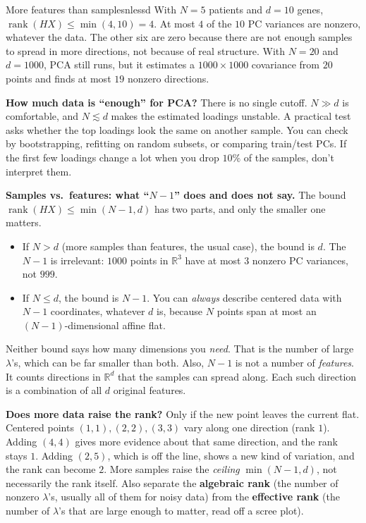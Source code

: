 \documentclass[11pt]{article}
\newcommand{\R}{\mathbb{R}}
\newcommand{\rank}{\operatorname{rank}}
\begin{document}
\begin{example}{More features than samples}{nlessd}
With $N=5$ patients and $d=10$ genes, $\rank(HX)\le\min(4,10)=4$. At most $4$ of
the $10$ PC variances are nonzero, whatever the data. The other six are zero because there
are not enough samples to spread in more directions, not because of real structure. With
$N=20$ and $d=1000$, PCA still runs, but it estimates a $1000\times1000$ covariance from
$20$ points and finds at most $19$ nonzero directions.
\end{example}

\begin{deeper}
\textbf{How much data is ``enough'' for PCA?} There is no single cutoff. $N\gg d$ is
comfortable, and $N\lesssim d$ makes the estimated loadings unstable. A practical test
asks whether the top loadings look the same on another sample. You can check by
bootstrapping, refitting on random subsets, or comparing train/test PCs. If the first few
loadings change a lot when you drop $10\%$ of the samples, don't interpret them.
\end{deeper}

\begin{careful}
\textbf{Samples vs.\ features: what ``$N-1$'' does and does not say.} The bound
$\rank(HX)\le\min(N-1,d)$ has two parts, and only the smaller one matters.
\begin{itemize}[nosep]
\item If $N>d$ (more samples than features, the usual case), the bound is $d$. The $N-1$ is
irrelevant: $1000$ points in $\R^3$ have at most $3$ nonzero PC variances, not $999$.
\item If $N\le d$, the bound is $N-1$. You can \emph{always} describe centered data with $N-1$
coordinates, whatever $d$ is, because $N$ points span at most an $(N-1)$-dimensional affine
flat.
\end{itemize}
Neither bound says how many dimensions you \emph{need}. That is the number of large
$\lambda$'s, which can be far smaller than both. Also, $N-1$ is not a number of \emph{features}.
It counts directions in $\R^d$ that the samples can spread along. Each such direction is a
combination of all $d$ original features.
\end{careful}

\begin{intuition}
\textbf{Does more data raise the rank?} Only if the new point leaves the current flat. Centered
points $(1,1),(2,2),(3,3)$ vary along one direction (rank $1$). Adding $(4,4)$ gives more evidence
about that same direction, and the rank stays $1$. Adding $(2,5)$, which is off the line, shows a
new kind of variation, and the rank can become $2$. More samples raise the \emph{ceiling}
$\min(N-1,d)$, not necessarily the rank itself. Also separate the \textbf{algebraic rank}
(the number of nonzero $\lambda$'s, usually all of them for noisy data) from the \textbf{effective
rank} (the number of $\lambda$'s that are large enough to matter, read off a scree plot).
\end{intuition}
\end{document}
